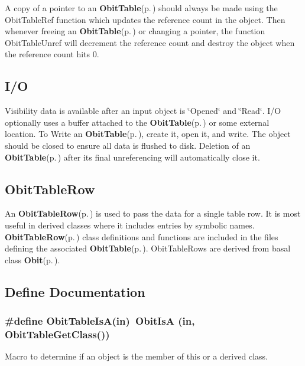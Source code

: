 A copy of a pointer to an {\bf Obit\-Table}{\rm (p.\,\pageref{structObitTable})} should always be made using the Obit\-Table\-Ref function which updates the reference count in the object. Then whenever freeing an {\bf Obit\-Table}{\rm (p.\,\pageref{structObitTable})} or changing a pointer, the function Obit\-Table\-Unref will decrement the reference count and destroy the object when the reference count hits 0.\subsection{I/O}\label{ObitTable_8h_ObitTableUsage}
Visibility data is available after an input object is \char`\"{}Opened\char`\"{} and \char`\"{}Read\char`\"{}. I/O optionally uses a buffer attached to the {\bf Obit\-Table}{\rm (p.\,\pageref{structObitTable})} or some external location. To Write an {\bf Obit\-Table}{\rm (p.\,\pageref{structObitTable})}, create it, open it, and write. The object should be closed to ensure all data is flushed to disk. Deletion of an {\bf Obit\-Table}{\rm (p.\,\pageref{structObitTable})} after its final unreferencing will automatically close it.\subsection{Obit\-Table\-Row}\label{ObitTable_8h_ObitTableRow}
An {\bf Obit\-Table\-Row}{\rm (p.\,\pageref{structObitTableRow})} is used to pass the data for a single table row. It is most useful in derived classes where it includes entries by symbolic names. {\bf Obit\-Table\-Row}{\rm (p.\,\pageref{structObitTableRow})} class definitions and functions are included in the files defining the associated {\bf Obit\-Table}{\rm (p.\,\pageref{structObitTable})}. Obit\-Table\-Rows are derived from basal class {\bf Obit}{\rm (p.\,\pageref{structObit})}.

\subsection{Define Documentation}
\subsubsection{\setlength{\rightskip}{0pt plus 5cm}\#define Obit\-Table\-Is\-A(in)\ Obit\-Is\-A (in, Obit\-Table\-Get\-Class())}\label{ObitTable_8h_a2}


Macro to determine if an object is the member of this or a derived class. 

